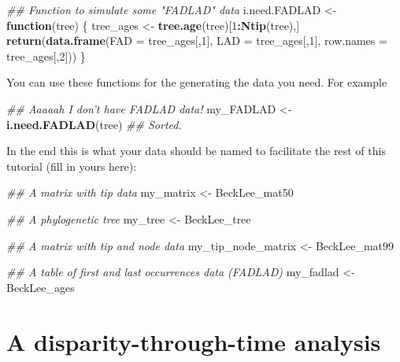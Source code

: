 \documentclass[]{book}
\newenvironment{Shaded}{\begin{snugshade}}{\end{snugshade}}
\newcommand{\CommentTok}[1]{\textcolor[rgb]{0.56,0.35,0.01}{\textit{#1}}}
\newcommand{\ControlFlowTok}[1]{\textcolor[rgb]{0.13,0.29,0.53}{\textbf{#1}}}
\newcommand{\DataTypeTok}[1]{\textcolor[rgb]{0.13,0.29,0.53}{#1}}
\newcommand{\DecValTok}[1]{\textcolor[rgb]{0.00,0.00,0.81}{#1}}
\newcommand{\KeywordTok}[1]{\textcolor[rgb]{0.13,0.29,0.53}{\textbf{#1}}}
\newcommand{\NormalTok}[1]{#1}
\newcommand{\OperatorTok}[1]{\textcolor[rgb]{0.81,0.36,0.00}{\textbf{#1}}}
\newcommand{\StringTok}[1]{\textcolor[rgb]{0.31,0.60,0.02}{#1}}
\begin{document}
\begin{Shaded}
\begin{Highlighting}[]
\CommentTok{## Function to simulate some "FADLAD" data}
\NormalTok{i.need.FADLAD <-}\StringTok{ }\ControlFlowTok{function}\NormalTok{(tree) \{}
\NormalTok{    tree_ages <-}\StringTok{ }\KeywordTok{tree.age}\NormalTok{(tree)[}\DecValTok{1}\OperatorTok{:}\KeywordTok{Ntip}\NormalTok{(tree),]}
    \KeywordTok{return}\NormalTok{(}\KeywordTok{data.frame}\NormalTok{(}\DataTypeTok{FAD =}\NormalTok{ tree_ages[,}\DecValTok{1}\NormalTok{], }\DataTypeTok{LAD =}\NormalTok{ tree_ages[,}\DecValTok{1}\NormalTok{], }\DataTypeTok{row.names =}\NormalTok{ tree_ages[,}\DecValTok{2}\NormalTok{]))}
\NormalTok{\}}
\end{Highlighting}
\end{Shaded}

You can use these functions for the generating the data you need. For example

\begin{Shaded}
\begin{Highlighting}[]
\CommentTok{## Aaaaah I don't have FADLAD data!}
\NormalTok{my_FADLAD <-}\StringTok{ }\KeywordTok{i.need.FADLAD}\NormalTok{(tree)}
\CommentTok{## Sorted.}
\end{Highlighting}
\end{Shaded}

In the end this is what your data should be named to facilitate the rest of this tutorial (fill in yours here):

\begin{Shaded}
\begin{Highlighting}[]
\CommentTok{## A matrix with tip data}
\NormalTok{my_matrix <-}\StringTok{ }\NormalTok{BeckLee_mat50}

\CommentTok{## A phylogenetic tree }
\NormalTok{my_tree <-}\StringTok{ }\NormalTok{BeckLee_tree}

\CommentTok{## A matrix with tip and node data}
\NormalTok{my_tip_node_matrix <-}\StringTok{ }\NormalTok{BeckLee_mat99}

\CommentTok{## A table of first and last occurrences data (FADLAD)}
\NormalTok{my_fadlad <-}\StringTok{ }\NormalTok{BeckLee_ages}
\end{Highlighting}
\end{Shaded}

\hypertarget{a-disparity-through-time-analysis}{%
\section{A disparity-through-time analysis}\label{a-disparity-through-time-analysis}}
\end{document}
